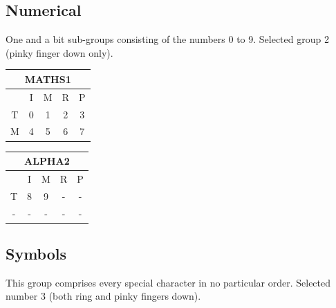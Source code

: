 \documentclass{article}
\begin{document}
\subsection{Numerical}
One and a bit sub-groups consisting of the numbers 0 to 9. Selected group 2 (pinky finger down only).

\begin{center}
	\begin{table}[!h]
		\begin{subtable}{0.45\textwidth}
			\centering
			\begin{tabular}{|c|c|c|c|c|}
				\hline
				\multicolumn{5}{|c|}{MATHS1}\\ \hline
				& I & M & R & P \\ \hline
				T & 0 & 1 & 2 & 3 \\ \hline
				M & 4 & 5 & 6 & 7 \\ \hline
			\end{tabular}
		\end{subtable}
		\begin{subtable}{0.45\textwidth}
			\centering
			\begin{tabular}{|c|c|c|c|c|}
				\hline
				\multicolumn{5}{|c|}{ALPHA2}\\ \hline
				& I & M & R & P \\ \hline
				T & 8 & 9 & - & - \\ \hline
				- & - & - & - & - \\ \hline
			\end{tabular}
		\end{subtable}
	\end{table}
\end{center}

\subsection{Symbols}
This group comprises every special character in no particular order. Selected number 3 (both ring and pinky fingers down).
\end{document}
